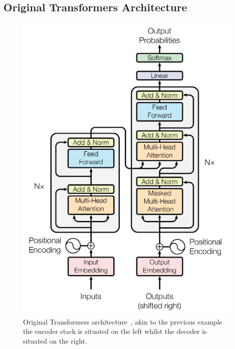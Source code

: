 \subsection{Original Transformers Architecture}
\begin{figure}[H]
	\centering
	\includegraphics[width=0.55\linewidth]{figures/original_transformer_archi.png}
	\caption{Original Transformers architecture~\autocite{vaswaniAttentionAllYou}, akin to the previous example the encoder stack
		is situated on the left whilst the decoder is situated on the right.}
	\label{fig:transformer_architecture}
\end{figure}
